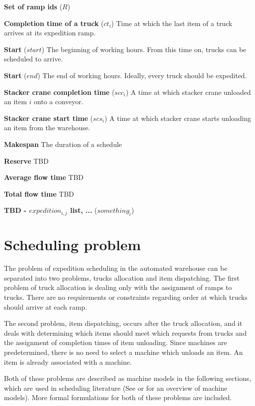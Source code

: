 \documentclass{ctuthesis}
\begin{document}
\noindent \textbf{Set of ramp ids} ($R$) 

\noindent \textbf{Completion time of a truck} ($ct_i$) Time at which the last item of a truck arrives at its expedition ramp.

\noindent \textbf{Start} ($start$) The beginning of working hours. From this time on, trucks can be scheduled to arrive.

\noindent \textbf{Start} ($end$) The end of working hours. Ideally, every truck should be expedited.

\noindent \textbf{Stacker crane completion time} ($scc_i$) A time at which stacker crane unloaded an item $i$ onto a conveyor.

\noindent \textbf{Stacker crane start time} ($scs_i$) A time at which stacker crane starts unloading an item from the warehouse.

\noindent \textbf{Makespan} The duration of a schedule

\noindent \textbf{Reserve} TBD

\noindent \textbf{Average flow time} TBD

\noindent \textbf{Total flow time} TBD

\noindent \textbf{TBD - $expedition_{i,j}$ list, ... } ($something_i$)


\section{Scheduling problem}
 
 The problem of expedition scheduling in the automated warehouse can be separated into two problems, trucks allocation and item dispatching. The first problem of truck allocation is dealing only with the assignment of ramps to trucks. There are no requirements or constraints regarding order at which trucks should arrive at each ramp.
 
 The second problem, item dispatching, occurs after the truck allocation, and it deals with determining which items should meet which requests from trucks and the assignment of completion times of item unloading. Since machines are predetermined, there is no need to select a machine which unloads an item. An item is already associated with a machine.
 
Both of these problems are described as machine models in the following sections, which are used in scheduling literature (See \cite{pinedo} or \cite{bucker} for an overview of machine models). More formal formulations for both of these problems are included.
 
\end{document}
